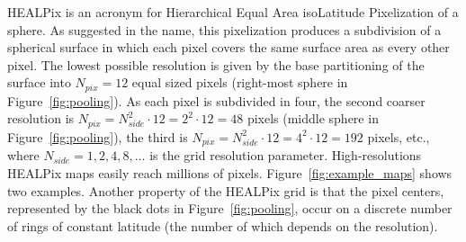 \documentclass[final,twocolumn,3p,times,authoryear]{elsarticle}
\newcommand{\nati}[1]{{\color[rgb]{.1,.6,.1}{#1}}}
\newcommand{\figref}[1]{Figure~\ref{fig:#1}}
\newcommand{\1}{\b{1}}              %
\newcommand{\0}{\b{0}}              %
\begin{document}
HEALPix is an acronym for Hierarchical Equal Area isoLatitude Pixelization of a sphere. As suggested in the name, this pixelization produces a subdivision of a spherical surface in which each pixel covers the same surface area as every other pixel.
The lowest possible resolution is given by the base partitioning of the surface into $N_{pix} = 12$ equal sized pixels (right-most sphere in \figref{pooling}). As each pixel is subdivided in four, the second coarser resolution is $N_{pix} = N_{side}^2 \cdot 12 = 2^2 \cdot 12 = 48$ pixels (middle sphere in \figref{pooling}), the third is $N_{pix} = N_{side}^2 \cdot 12 = 4^2 \cdot 12 = 192$ pixels, etc., where $N_{side} = 1, 2, 4, 8, \ldots$ is the grid resolution parameter.
High-resolutions HEALPix maps easily reach millions of pixels. \figref{example_maps} shows two examples.
Another property of the HEALPix grid is that the pixel centers, represented by the black dots in \figref{pooling}, occur on a discrete number of rings of constant latitude (the number of which depends on the resolution).
\nati{The figure is beautiful, but should we really show it? If we target cosmologists, we can simply list some type of data. If we target a more broad audience, maybe it makes sense to provide some illustration.}
\end{document}

